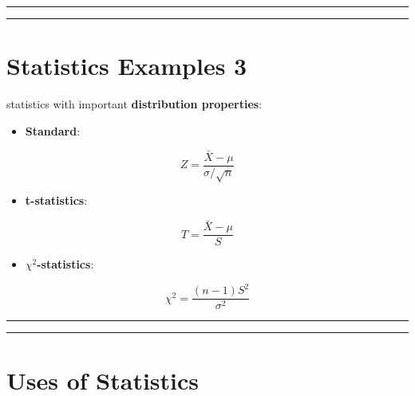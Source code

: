 \documentclass[
]{book}
\providecommand{\tightlist}{%
  \setlength{\itemsep}{0pt}\setlength{\parskip}{0pt}}
\begin{document}
\begin{center}\rule{0.5\linewidth}{0.5pt}\end{center}

\begin{center}\rule{0.5\linewidth}{0.5pt}\end{center}

\hypertarget{statistics-examples-3}{%
\section{Statistics Examples 3}\label{statistics-examples-3}}

statistics with important \textbf{distribution properties}:

\begin{itemize}
\tightlist
\item
  \textbf{Standard}:
\end{itemize}

\[Z=\frac{\bar{X}-\mu}{\sigma/\sqrt{n}}\]

\begin{itemize}
\tightlist
\item
  \textbf{t-statistics}:
\end{itemize}

\[T=\frac{\bar{X}-\mu}{S}\]

\begin{itemize}
\tightlist
\item
  \textbf{\(\chi^2\)-statistics}:
\end{itemize}

\[\chi^2=\frac{(n-1)S^2}{\sigma^2}\]

\begin{center}\rule{0.5\linewidth}{0.5pt}\end{center}

\begin{center}\rule{0.5\linewidth}{0.5pt}\end{center}

\hypertarget{uses-of-statistics}{%
\section{Uses of Statistics}\label{uses-of-statistics}}
\end{document}
